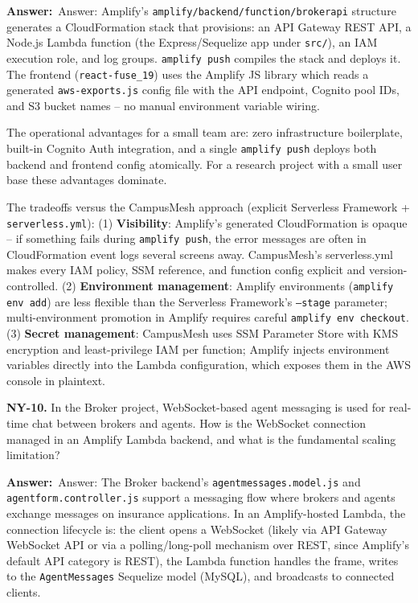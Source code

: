 \documentclass[letterpaper,10pt]{article}
\newlength{\boxwidth}
\newcommand{\answerlabel}{\noindent\textbf{\textcolor{answerblue}{Answer:}}~}
\begin{document}
\vspace{2pt}
\answerlabel{Answer:} Amplify's \texttt{amplify/backend/function/brokerapi} structure generates a CloudFormation stack that provisions: an API Gateway REST API, a Node.js Lambda function (the Express/Sequelize app under \texttt{src/}), an IAM execution role, and log groups. \texttt{amplify push} compiles the stack and deploys it. The frontend (\texttt{react-fuse\_19}) uses the Amplify JS library which reads a generated \texttt{aws-exports.js} config file with the API endpoint, Cognito pool IDs, and S3 bucket names -- no manual environment variable wiring.

The operational advantages for a small team are: zero infrastructure boilerplate, built-in Cognito Auth integration, and a single \texttt{amplify push} deploys both backend and frontend config atomically. For a research project with a small user base these advantages dominate.

The tradeoffs versus the CampusMesh approach (explicit Serverless Framework + \texttt{serverless.yml}): (1) \textbf{Visibility}: Amplify's generated CloudFormation is opaque -- if something fails during \texttt{amplify push}, the error messages are often in CloudFormation event logs several screens away. CampusMesh's serverless.yml makes every IAM policy, SSM reference, and function config explicit and version-controlled. (2) \textbf{Environment management}: Amplify environments (\texttt{amplify env add}) are less flexible than the Serverless Framework's \texttt{--stage} parameter; multi-environment promotion in Amplify requires careful \texttt{amplify env checkout}. (3) \textbf{Secret management}: CampusMesh uses SSM Parameter Store with KMS encryption and least-privilege IAM per function; Amplify injects environment variables directly into the Lambda configuration, which exposes them in the AWS console in plaintext.

\vspace{6pt}

\colorbox{qbg}{\begin{minipage}{\boxwidth}
\textbf{NY-10.} In the Broker project, WebSocket-based agent messaging is used for real-time chat between brokers and agents. How is the WebSocket connection managed in an Amplify Lambda backend, and what is the fundamental scaling limitation?
\end{minipage}}

\vspace{2pt}
\answerlabel{Answer:} The Broker backend's \texttt{agentmessages.model.js} and \texttt{agentform.controller.js} support a messaging flow where brokers and agents exchange messages on insurance applications. In an Amplify-hosted Lambda, the connection lifecycle is: the client opens a WebSocket (likely via API Gateway WebSocket API or via a polling/long-poll mechanism over REST, since Amplify's default API category is REST), the Lambda function handles the frame, writes to the \texttt{AgentMessages} Sequelize model (MySQL), and broadcasts to connected clients.
\end{document}
